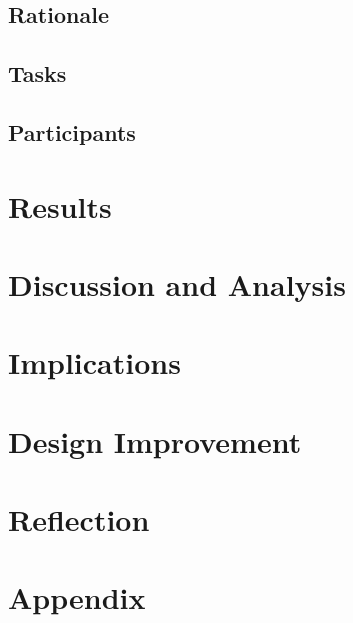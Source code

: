 \documentclass[pdftex,12pt,a4paper]{report}
\begin{document}
\section{Rationale}
\section{Tasks}
\section{Participants}

\chapter{Results}
\chapter{Discussion and Analysis}
\chapter{Implications}
\chapter{Design Improvement}
\chapter{Reflection}
\chapter{Appendix}
\end{document}
